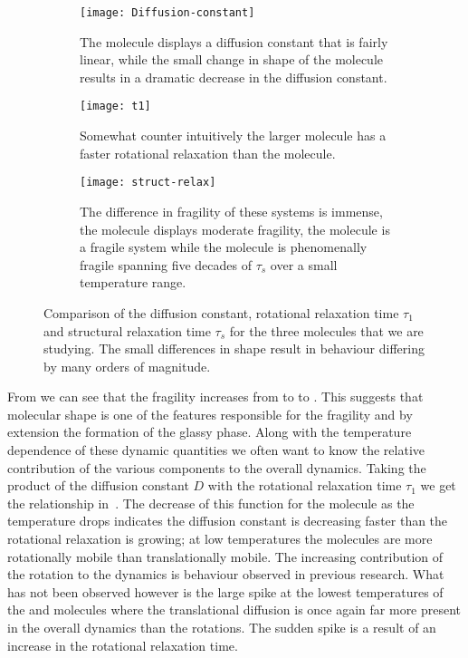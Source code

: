 \begin{figure}
    \centering
    \begin{subfigure}{0.6\linewidth}
        \texttt{[image: Diffusion-constant]}
        \caption{The \sone molecule displays a diffusion constant that is fairly linear, while the small change in shape of the \scon molecule results in a dramatic decrease in the diffusion constant.}
        \label{fig:diffusion constant}
    \end{subfigure}
    \begin{subfigure}{0.6\linewidth}
        \texttt{[image: t1]}
        \caption{Somewhat counter intuitively the larger \tri molecule has a faster rotational relaxation than the \scon molecule.}
        \label{fig:tau1}
    \end{subfigure}
    \begin{subfigure}{0.6\textwidth}
        \texttt{[image: struct-relax]}
        \caption{The difference in fragility of these systems is immense, the \sone molecule displays moderate fragility, the \tri molecule is a fragile system while the \scon molecule is phenomenally fragile spanning five decades of $\tau_s$ over a small temperature range.}
        \label{fig:struct relax}
    \end{subfigure}
    \caption{Comparison of the diffusion constant, rotational relaxation time $\tau_1$ and structural relaxation time $\tau_s$ for the three molecules that we are studying. The small differences in shape result in behaviour differing by many orders of magnitude.}

    \label{fig:dynamic comparison}
\end{figure}

From  we can see that the fragility increases from \sone to \tri to \scon. This suggests that molecular shape is one of the features responsible for the fragility and by extension the formation of the glassy phase. Along with the temperature dependence of these dynamic quantities we often want to know the relative contribution of the various components to the overall dynamics. Taking the product of the diffusion constant $D$ with the rotational relaxation time $\tau_1$ we get the relationship in~. The decrease of this function for the \tri molecule as the temperature drops indicates the diffusion constant is decreasing faster than the rotational relaxation is growing; at low temperatures the molecules are more rotationally mobile than translationally mobile. The increasing contribution of the rotation to the dynamics is behaviour observed in previous research. What has not been observed however is the large spike at the lowest temperatures of the \sone and \scon molecules where the translational diffusion is once again far more present in the overall dynamics than the rotations. The sudden spike is a result of an increase in the rotational relaxation time.


